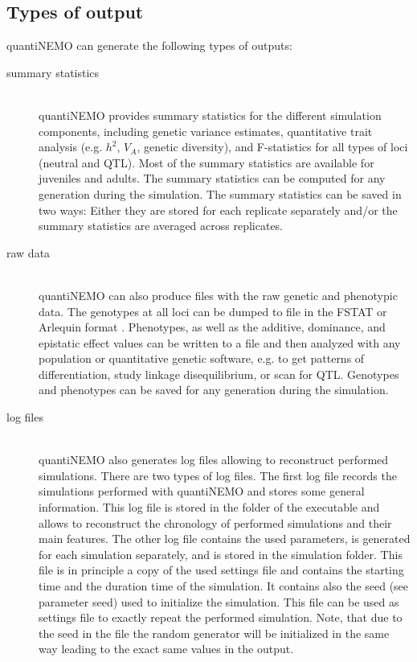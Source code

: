 \documentclass[letterpaper,12pt,oneside]{book}
\begin{document}
\subsection[Types]{Types of output}
quantiNEMO can generate the following types of outputs:
\begin{description}
\item[summary statistics]\hspace*{\fill}\\
quantiNEMO provides summary statistics for the different simulation components, including genetic variance estimates, quantitative trait analysis (e.g. $h^{2}$, $V_{A}$, genetic diversity), and F-statistics for all types of loci (neutral and QTL). Most of the summary statistics are available for juveniles and adults. The summary statistics can be computed for any generation during the simulation. The summary statistics can be saved in two ways: Either they are stored for each replicate separately and/or the summary statistics are averaged across replicates.  

\item[raw data]\hspace*{\fill}\\
quantiNEMO can also produce files with the raw genetic and phenotypic data. The genotypes at all loci can be dumped to file in the FSTAT  \citep{Goudet_1995} or Arlequin format \citep{Excoffier_2010}. Phenotypes, as well as the additive, dominance, and epistatic effect values can be written to a file and then analyzed with any population or quantitative genetic software, e.g. to get patterns of differentiation, study linkage disequilibrium, or scan for QTL. Genotypes and phenotypes can be saved for any generation during the simulation.

\item[log files]\hspace*{\fill}\\
quantiNEMO also generates log files allowing to reconstruct performed simulations. There are two types of log files. The first log file records the simulations performed with quantiNEMO and stores some general information. This log file is stored in the folder of the executable and allows to reconstruct the chronology of performed simulations and their main features. The other log file contains the used parameters, is generated for each simulation separately, and is stored in the simulation folder. This file is in principle a copy of the used settings file and contains the starting time and the duration time of the simulation. It contains also the seed (see parameter \textsf{seed}) used to initialize the simulation. This file can be used as settings file to exactly repeat the performed simulation. Note, that due to the seed in the file the random generator will be initialized in the same way leading to the exact same values in the output.
\end{description}
\end{document}

